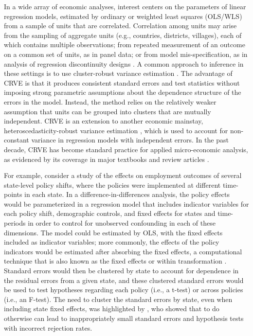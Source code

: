 \documentclass[12pt]{article}\usepackage[]{graphicx}\usepackage[]{color}
\begin{document}
In a wide array of economic analyses, interest centers on the parameters of linear regression models, estimated by ordinary or weighted least squares (OLS/WLS) from a sample of units that are correlated. 
Correlation among units may arise from the sampling of aggregate units (e.g., countries, districts, villages), each of which contains multiple observations; from repeated measurement of an outcome on a common set of units, as in panel data; or from model mis-specification, as in analysis of regression discontinuity designs \citep{Lee2008regression}. 
A common approach to inference in these settings is to use cluster-robust variance estimation \citep[CRVE;][]{Arellano1987computing, Liang1986longitudinal, white1984asymptotic}.
The advantage of CRVE is that it produces consistent standard errors and test statistics without imposing strong parametric assumptions about the dependence structure of the errors in the model.
Instead, the method relies on the relatively weaker assumption that units can be grouped into clusters that are mutually independent. 
CRVE is an extension to another economic mainstay, heteroscedasticity-robust variance estimation \citep{eicker1967limit, Huber1967behavior, White1980heteroskedasticity}, which is used to account for non-constant variance in regression models with independent errors.
In the past decade, CRVE has become standard practice for applied micro-economic analysis, as evidenced by its coverage in major textbooks and review articles \citep[e.g.,][]{Wooldridge2010econometric, Angrist2009mostly, Cameron2015practitioners}.

For example, consider a study of the effects on employment outcomes of several state-level policy shifts, where the policies were implemented at different time-points in each state. 
In a difference-in-differences analysis, the policy effects would be parameterized in a regression model that includes indicator variables for each policy shift, demographic controls, and fixed effects for states and time-periods in order to control for unobserved confounding in each of these dimensions. 
The model could be estimated by OLS, with the fixed effects included as indicator variables; more commonly, the effects of the policy indicators would be estimated after absorbing the fixed effects, a computational technique that is also known as the fixed effects or within transformation \citep{Wooldridge2010econometric}. 
Standard errors would then be clustered by state to account for dependence in the residual errors from a given state, and these clustered standard errors would be used to test hypotheses regarding each policy (i.e., a t-test) or across policies (i.e., an F-test).
The need to cluster the standard errors by state, even when including state fixed effects, was highlighted by \citet{Bertrand2004how}, who showed that to do otherwise can lead to inappropriately small standard errors and hypothesis tests with incorrect rejection rates. 
\end{document}
